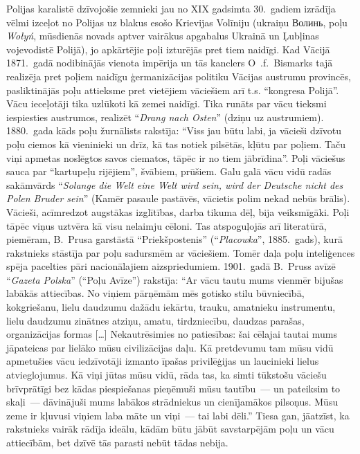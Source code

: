 \documentclass[twoside,a5paper,12pt,fleqn,openany]{extbook}
\newcommand{\pltxti}[1]{\textit{\textpolish{#1}}}
\newcommand{\detxti}[1]{\textit{\textgerman{#1}}}
\newcommand{\uktxti}[1]{\textukrainian{#1}}
\newcommand{\citespace}{[\dots{}]}
\begin{document}
Polijas karalistē dzīvojošie  zemnieki jau no XIX gadsimta 30.~gadiem izrādīja vēlmi izceļot no Polijas uz blakus esošo Krievijas Volīniju (ukraiņu \uktxti{Волинь}, poļu \pltxti{Wołyń}, mūsdienās novads aptver vairākus apgabalus Ukrainā un Ļubļinas vojevodistē Polijā), jo apkārtējie poļi izturējās pret tiem naidīgi. Kad Vācijā 1871.~gadā nodibinājās vienota impērija un tās kanclers O~.f.~Bismarks tajā realizēja pret poļiem naidīgu ģermanizācijas politiku Vācijas austrumu provincēs, pasliktinājās poļu attieksme pret vietējiem vāciešiem arī t.s. ``kongresa Polijā''. Vācu ieceļotāji tika uzlūkoti kā zemei naidīgi. Tika runāts par vācu tieksmi iespiesties austrumos, realizēt ``\detxti{Drang nach Osten}'' (dziņu uz austrumiem). 1880.~gada kāds poļu žurnālists rakstīja: ``Viss jau būtu labi, ja vācieši dzīvotu poļu ciemos kā vieninieki un drīz, kā tas notiek pilsētās, kļūtu par poļiem. Taču viņi apmetas noslēgtos savos ciematos, tāpēc ir no tiem jābrīdina''. Poļi vāciešus sauca par ``kartupeļu rijējiem'', švābiem, prūšiem. Galu galā vācu vidū radās sakāmvārds ``\detxti{Solange die Welt eine Welt wird sein, wird der Deutsche nicht des Polen Bruder sein}'' (Kamēr pasaule pastāvēs, vācietis polim nekad nebūs brālis). Vācieši, acīmredzot augstākas izglītības, darba tikuma dēļ, bija veiksmīgāki. Poļi tāpēc viņus uztvēra kā visu nelaimju cēloni. Tas atspoguļojās arī literatūrā, piemēram, B.~Prusa garstāstā ``Priekšpostenis'' (``\pltxti{Placowka}'', 1885.~gads), kurā rakstnieks stāstīja par poļu sadursmēm ar vāciešiem. Tomēr daļa poļu inteliģences spēja pacelties pāri nacionālajiem aizspriedumiem. 1901.~gadā B.~Pruss avīzē ``\pltxti{Gazeta Polska}'' (``Poļu Avīze'') rakstīja: ``Ar vācu tautu mums vienmēr bijušas labākās attiecības. No viņiem pārņēmām mēs gotisko stilu būvniecībā, kokgriešanu, lielu daudzumu dažādu iekārtu, trauku, amatnieku instrumentu, lielu daudzumu zinātnes atziņu, amatu, tirdzniecību, daudzas parašas, organizācijas formas \citespace{} Nekautrēsimies no patiesības: šai cēlajai tautai mums jāpateicas par lielāko mūsu civilizācijas daļu. Kā pretdevumu tam mūsu vidū apmetušies vācu iedzīvotāji izmanto īpašas privilēģijas un laucinieki lielus atvieglojumus. Kā viņi jūtas mūsu vidū, rāda tas, ka simti tūkstošu vāciešu brīvprātīgi bez kādas piespiešanas pieņēmuši mūsu tautību~--- un pateiksim to skaļi~--- dāvinājuši mums labākos strādniekus un cienījamākos pilsoņus. Mūsu zeme ir kļuvusi viņiem laba māte un viņi~--- tai labi dēli.'' Tiesa gan, jāatzīst, ka rakstnieks vairāk rādīja ideālu, kādām būtu jābūt savstarpējām poļu un vācu attiecībām, bet dzīvē tās parasti nebūt tādas nebija.
\end{document}
